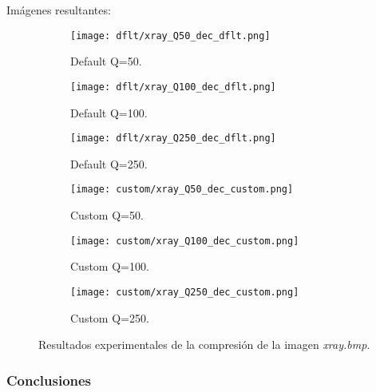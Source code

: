 \documentclass[12pt,a4paper]{article}
\begin{document}
    \vspace{0.5cm}

Imágenes resultantes:
\begin{figure}   [H]
    \begin{subfigure}{0.30\textwidth}
        \centering
        \texttt{[image: dflt/xray\_Q50\_dec\_dflt.png]}
        \caption{Default Q=50.}
        
    \end{subfigure}
    \hfill
    \begin{subfigure}{0.30\textwidth}
        \centering
        \texttt{[image: dflt/xray\_Q100\_dec\_dflt.png]}
        \caption{Default Q=100.}
        
    \end{subfigure}
    \hfill
    \begin{subfigure}{0.30\textwidth}
        \centering
        \texttt{[image: dflt/xray\_Q250\_dec\_dflt.png]}
        \caption{Default Q=250.}
        
    \end{subfigure}
    
    \vspace{0.5cm}
    
    \begin{subfigure}{0.30\textwidth}
        \centering
        \texttt{[image: custom/xray\_Q50\_dec\_custom.png]}
        \caption{Custom Q=50.}
        
    \end{subfigure}
    \hfill
    \begin{subfigure}{0.30\textwidth}
        \centering
        \texttt{[image: custom/xray\_Q100\_dec\_custom.png]}
        \caption{Custom Q=100.}
        
    \end{subfigure}
    \hfill
    \begin{subfigure}{0.30\textwidth}
        \centering
        \texttt{[image: custom/xray\_Q250\_dec\_custom.png]}
        \caption{Custom Q=250.}
        
    \end{subfigure}
    
    \caption[Resultados experimentales - x-ray]{Resultados experimentales de la compresión de la imagen \textit{xray.bmp}.}
    
\end{figure}


\subsubsection{Conclusiones}
\end{document}

